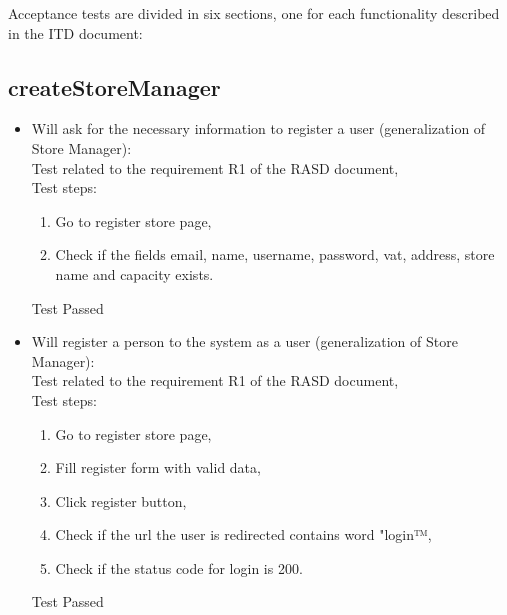 Acceptance tests are divided in six sections, one for each functionality described in the ITD document:

\subsection{createStoreManager}

\begin{itemize}
    \item Will ask for the necessary information to register a user (generalization of Store Manager): \\
    Test related to the requirement R1 of the RASD document, \\
    Test steps:
    \begin{enumerate}
        \item Go to register store page,
        \item Check if the fields email, name, username, password, vat, address, store name and capacity exists.
    \end{enumerate}
    Test Passed \\

    \item Will register a person to the system as a user (generalization of Store Manager): \\
    Test related to the requirement R1 of the RASD document, \\
    Test steps:
    \begin{enumerate}
        \item Go to register store page,
        \item Fill register form with valid data,
        \item Click register button,
        \item Check if the url the user is redirected contains word "login™,
        \item Check if the status code for login is 200.
    \end{enumerate}
    Test Passed\\


\end{itemize}
